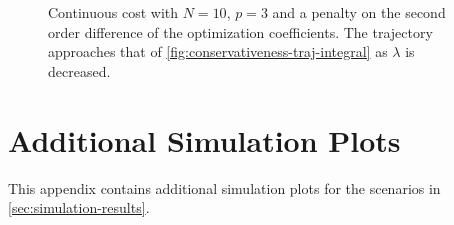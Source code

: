 \begin{figure}
    \centering
    
    \caption{Continuous cost with $N=10$, $p=3$ and a penalty on the second order difference of the optimization coefficients. The trajectory approaches that of \cref{fig:conservativeness-traj-integral} as $\lambda$ is decreased.}\label{fig:conservativeness-oscillation-damping}
\end{figure}


\chapter{Additional Simulation Plots}\label{app:additional-simulation-plots}

This appendix contains additional simulation plots for the scenarios in \cref{sec:simulation-results}.


